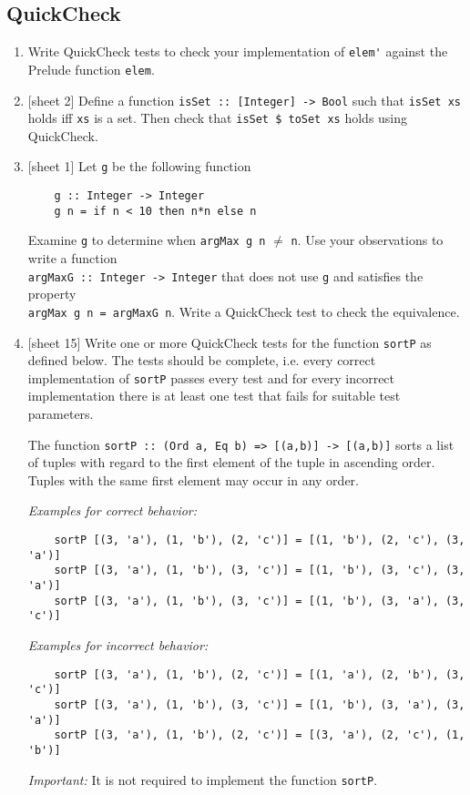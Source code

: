 \documentclass{article}
\begin{document}
\subsection{QuickCheck}
\begin{enumerate}
\item Write QuickCheck tests to check your implementation of \verb|elem'| against the Prelude function \verb|elem|.

\item {[sheet 2]} Define a function \verb|isSet :: [Integer] -> Bool| such that \verb|isSet xs| holds iff \verb|xs| is a set. Then check that \verb|isSet $ toSet xs| holds using QuickCheck.

\item {[sheet 1]} Let \verb|g| be the following function
\begin{verbatim}
    g :: Integer -> Integer
    g n = if n < 10 then n*n else n
\end{verbatim}
Examine \verb|g| to determine when \verb|argMax g n| $\neq$ \verb|n|. Use your observations to write a function \\ \verb|argMaxG :: Integer -> Integer| that does not use \verb|g| and satisfies the property \\ \verb|argMax g n = argMaxG n|. Write a QuickCheck test to check the equivalence.

\item {[sheet 15]} Write one or more QuickCheck tests for the function \verb|sortP| as defined below. The tests should be complete, i.e. every correct implementation of \verb|sortP| passes every test and for every incorrect implementation there is at least one test that fails for suitable test parameters. \par
The function \verb|sortP :: (Ord a, Eq b) => [(a,b)] -> [(a,b)]| sorts a list of tuples with regard to the first element of the tuple in ascending order. Tuples with the same first element may occur in any order. \par
\textit{Examples for correct behavior:}
\begin{verbatim}
    sortP [(3, 'a'), (1, 'b'), (2, 'c')] = [(1, 'b'), (2, 'c'), (3, 'a')]
    sortP [(3, 'a'), (1, 'b'), (3, 'c')] = [(1, 'b'), (3, 'c'), (3, 'a')]
    sortP [(3, 'a'), (1, 'b'), (3, 'c')] = [(1, 'b'), (3, 'a'), (3, 'c')]
\end{verbatim}
\textit{Examples for incorrect behavior:}
\begin{verbatim}
    sortP [(3, 'a'), (1, 'b'), (2, 'c')] = [(1, 'a'), (2, 'b'), (3, 'c')]
    sortP [(3, 'a'), (1, 'b'), (3, 'c')] = [(1, 'b'), (3, 'a'), (3, 'a')]
    sortP [(3, 'a'), (1, 'b'), (2, 'c')] = [(3, 'a'), (2, 'c'), (1, 'b')]
\end{verbatim}
\textit{Important:} It is not required to implement the function \verb|sortP|.


\end{enumerate}
\end{document}
